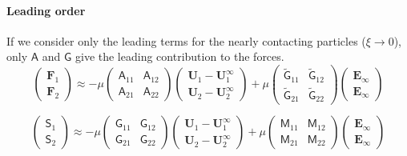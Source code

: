 \documentclass[11pt]{scrartcl}
\newcommand{\tens}[1]{\bm{\mathsf{#1}}}
\begin{document}
\paragraph{Leading order}
If we consider only the leading terms for 
the nearly contacting particles ($\xi \to 0$),
only $\tens{A}$ and $\tens{G}$ give the leading contribution to the forces.
\begin{equation}
 \begin{pmatrix}
  \bm{F}_{1} \\
  \bm{F}_{2} 
 \end{pmatrix}
\approx
- \mu
\begin{pmatrix}
\tens{A}_{11} &
\tens{A}_{12}  \\
\tens{A}_{21}  &
\tens{A}_{22}  
\end{pmatrix}
 \begin{pmatrix}
  \bm{U}_{1} -  \bm{U}_{1}^{\infty}\\
  \bm{U}_{2} -  \bm{U}_{2}^{\infty}
 \end{pmatrix}
 + \mu
\begin{pmatrix}
\tilde{\tens{G}}_{11} &
\tilde{\tens{G}}_{12}  \\
\tilde{\tens{G}}_{21}  &
\tilde{\tens{G}}_{22}  
\end{pmatrix}
 \begin{pmatrix}
\bm{E}_{\infty} \\ \bm{E}_{\infty}
\end{pmatrix}
\end{equation}

\begin{equation}
 \begin{pmatrix}
  \tens{S}_{1} \\
  \tens{S}_{2} 
 \end{pmatrix}
\approx
- \mu
\begin{pmatrix}
\tens{G}_{11} &
\tens{G}_{12}  \\
\tens{G}_{21}  &
\tens{G}_{22}  
\end{pmatrix}
 \begin{pmatrix}
  \bm{U}_{1} -  \bm{U}_{1}^{\infty}\\
  \bm{U}_{2} -  \bm{U}_{2}^{\infty}
 \end{pmatrix}
 + \mu
\begin{pmatrix}
\tens{M}_{11} &
\tens{M}_{12}  \\
\tens{M}_{21}  &
\tens{M}_{22}  
\end{pmatrix}
 \begin{pmatrix}
\bm{E}_{\infty} \\ \bm{E}_{\infty}
\end{pmatrix}
\end{equation}
\end{document}
